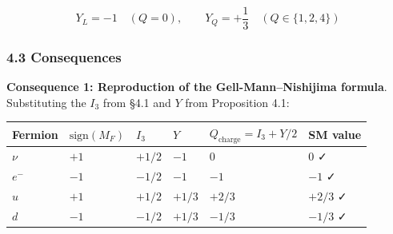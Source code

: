 \documentclass[
  a4paper,11pt]{article}
\newcounter{none} %
\begin{document}
\[Y_L = -1 \quad (Q = 0), \qquad Y_Q = +\frac{1}{3} \quad (Q \in \{1,2,4\})\]

\subsubsection{4.3 Consequences}\label{consequences}

\textbf{Consequence 1: Reproduction of the Gell-Mann--Nishijima
formula}. Substituting the \(I_3\) from §4.1 and \(Y\) from Proposition
4.1:

{\def\LTcaptype{none} %
\begin{longtable}[]{@{}
  >{\raggedright\arraybackslash}p{}
  >{\centering\arraybackslash}p{}
  >{\centering\arraybackslash}p{}
  >{\centering\arraybackslash}p{}
  >{\centering\arraybackslash}p{}
  >{\centering\arraybackslash}p{}@{}}
\toprule\noalign{}
\begin{minipage}[b]{\linewidth}\raggedright
Fermion
\end{minipage} & \begin{minipage}[b]{\linewidth}\centering
\(\text{sign}(M_F)\)
\end{minipage} & \begin{minipage}[b]{\linewidth}\centering
\(I_3\)
\end{minipage} & \begin{minipage}[b]{\linewidth}\centering
\(Y\)
\end{minipage} & \begin{minipage}[b]{\linewidth}\centering
\(Q_{\text{charge}} = I_3 + Y/2\)
\end{minipage} & \begin{minipage}[b]{\linewidth}\centering
SM value
\end{minipage} \\
\midrule\noalign{}
\endhead
\bottomrule\noalign{}
\endlastfoot
\(\nu\) & \(+1\) & \(+1/2\) & \(-1\) & \(0\) & \(0\) ✓ \\
\(e^-\) & \(-1\) & \(-1/2\) & \(-1\) & \(-1\) & \(-1\) ✓ \\
\(u\) & \(+1\) & \(+1/2\) & \(+1/3\) & \(+2/3\) & \(+2/3\) ✓ \\
\(d\) & \(-1\) & \(-1/2\) & \(+1/3\) & \(-1/3\) & \(-1/3\) ✓ \\
\end{longtable}
}
\end{document}
